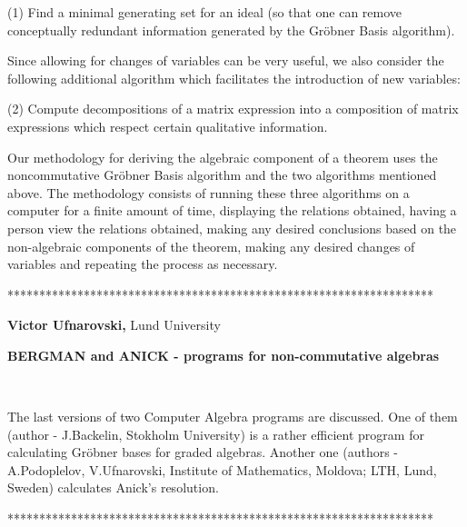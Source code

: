 \documentclass[12pt]{article}
\begin{document}
\vspace{.05in}

(1) Find a minimal generating set for an ideal (so that one can remove
conceptually redundant information generated by the Gr\"{o}bner Basis
algorithm).

\vspace{.05in}

\noindent Since allowing for changes of variables can be very useful, we
also consider the following additional algorithm which facilitates the
introduction of new variables:

\vspace{.05in}

(2) Compute decompositions of a matrix expression into a composition of
matrix expressions which respect certain qualitative information.

\vspace{.05in}

Our methodology for deriving the algebraic component of a theorem uses the
noncommutative Gr\"{o}bner Basis algorithm and the two algorithms mentioned
above. The methodology consists of running these three algorithms on a
computer for a finite amount of time, displaying the relations obtained,
having a person view the relations obtained, making any desired conclusions
based on the non-algebraic components of the theorem, making any desired
changes of variables and repeating the process as necessary.

\begin{center}
*******************************************************************
\end{center}

\vspace{.1in}

\noindent \textbf{Victor Ufnarovski,} Lund University\ 

\noindent  \textbf{BERGMAN and ANICK - programs for non-commutative algebras}

\smallskip\ 

\noindent  The last versions of two Computer Algebra programs are discussed.
One of them (author - J.Backelin, Stokholm University) is a rather efficient
program for calculating Gr\"{o}bner bases for graded algebras. Another one
(authors - A.Podoplelov, V.Ufnarovski, Institute of Mathematics, Moldova;
LTH, Lund, Sweden) calculates Anick's resolution.

\smallskip 

*******************************************************************
\end{document}
